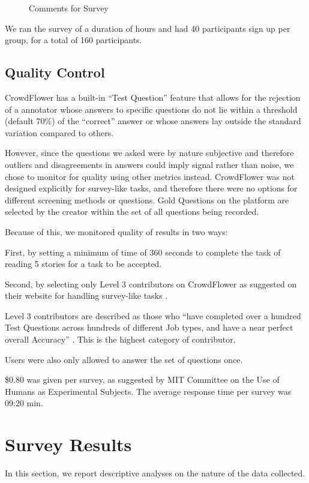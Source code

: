 \begin{figure}[H] 
\centering
  \caption{Comments for Survey}
\end{figure}

We ran the survey of a duration of  hours and had 40 participants sign up per group, for a total of 160 participants.

\subsection{Quality Control}

CrowdFlower has a built-in ``Test Question'' feature that allows for the rejection of a annotator whose answers to specific questions do not lie within a threshold (default 70\%) of the ``correct'' answer or whose answers lay outside the standard variation compared to others.

However, since the questions we asked were by nature subjective and therefore outliers and disagreements in answers could imply signal rather than noise, we chose to monitor for quality using other metrics instead. CrowdFlower was not designed explicitly for survey-like tasks, and therefore there were no options for different screening methods or questions. Gold Questions on the platform are selected by the creator within the set of all questions being recorded.

Because of this, we monitored quality of results in two ways:

First, by setting a minimum of time of 360 seconds to complete the task of reading 5 stories for a task to be accepted.

Second, by selecting only Level 3 contributors on CrowdFlower as suggested on their website for handling survey-like tasks \cite{CrowdFlower-guide}.

Level 3 contributors are described as those who ``have completed over a hundred Test Questions across hundreds of different Job types, and have a near perfect overall Accuracy'' \cite{CrowdFlower-levels}. This is the highest category of contributor.
 
Users were also only allowed to answer the set of questions once. 

\$0.80 was given per survey, as suggested by MIT Committee on the Use of Humans as Experimental Subjects. The average response time per survey was 09:20 min.


\section{Survey Results}
In this section, we report descriptive analyses on the nature of the data collected.

